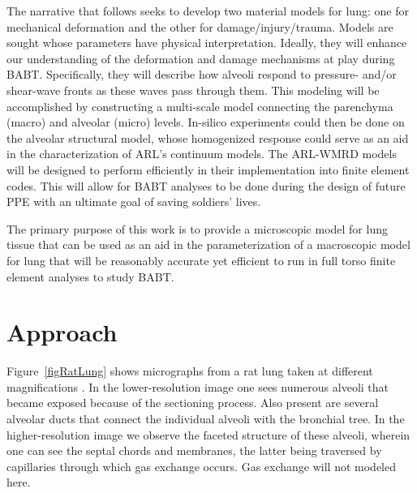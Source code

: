 The narrative that follows seeks to develop two material models for lung: one for mechanical deformation and the other for damage\slash injury\slash trauma.  Models are sought whose parameters have physical interpretation.  Ideally, they will enhance our understanding of the deformation and damage mechanisms at play during BABT.  Specifically, they will describe how alveoli respond to pressure- and\slash or shear-wave fronts as these waves pass through them.  This modeling will be accomplished by constructing a multi-scale model connecting the parenchyma (macro) and alveolar (micro) levels.  In-silico experiments could then be done on the alveolar structural model, whose homogenized response could serve as an aid in the characterization of ARL's continuum models.  The ARL-WMRD models will be designed to perform efficiently in their implementation into finite element codes.  This will allow for BABT analyses to be done during the design of future PPE with an ultimate goal of saving soldiers' lives.

The primary purpose of this work is to provide a micro\-scopic model for lung tissue that can be used as an aid in the parameterization of a macro\-scopic model for lung that will be reasonably accurate yet efficient to run in full torso finite element analyses to study BABT.

\section{Approach}

Figure~\ref{figRatLung} shows micrographs from a rat lung taken at different magnifications \cite{Freedetal12}. In the lower-resolution image one sees numerous alveoli that became exposed because of the sectioning process.  Also present are several alveolar ducts that connect the individual alveoli with the bronchial tree.  In the higher-resolution image we observe the faceted structure of these alveoli, wherein one can see the septal chords and membranes, the latter being traversed by capillaries through which gas exchange occurs.  Gas exchange will not modeled here.


